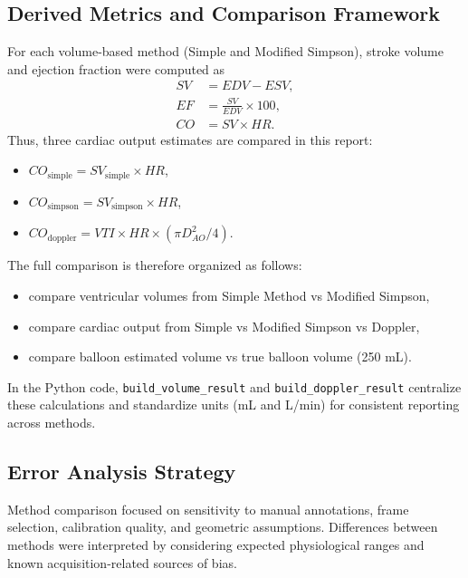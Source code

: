 \subsection{Derived Metrics and Comparison Framework}
For each volume-based method (Simple and Modified Simpson), stroke volume and ejection fraction were computed as
\begin{align}
SV &= EDV - ESV, \\
EF &= \frac{SV}{EDV} \times 100, \\
CO &= SV \times HR.
\end{align}
Thus, three cardiac output estimates are compared in this report:
\begin{itemize}
    \item $CO_{\mathrm{simple}} = SV_{\mathrm{simple}} \times HR$,
    \item $CO_{\mathrm{simpson}} = SV_{\mathrm{simpson}} \times HR$,
    \item $CO_{\mathrm{doppler}} = VTI \times HR \times (\pi D_{AO}^2/4)$.
\end{itemize}
The full comparison is therefore organized as follows:
\begin{itemize}
    \item compare ventricular volumes from Simple Method vs Modified Simpson,
    \item compare cardiac output from Simple vs Modified Simpson vs Doppler,
    \item compare balloon estimated volume vs true balloon volume (250 mL).
\end{itemize}
In the Python code, \texttt{build\_volume\_result} and \texttt{build\_doppler\_result} centralize these calculations and standardize units (mL and L/min) for consistent reporting across methods.

\subsection{Error Analysis Strategy}
Method comparison focused on sensitivity to manual annotations, frame selection, calibration quality, and geometric assumptions. Differences between methods were interpreted by considering expected physiological ranges and known acquisition-related sources of bias.
